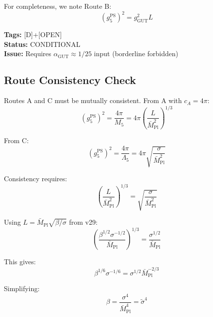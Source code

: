 \documentclass[11pt,a4paper]{article}
\theoremstyle{definition}
\begin{document}
For completeness, we note Route B:
\begin{equation}
\label{eq:route-b-formula}
(g_5^{\text{PS}})^2 = g_{\text{GUT}}^2 L
\end{equation}

\textbf{Tags:} [D]+[OPEN] \\
\textbf{Status:} CONDITIONAL \\
\textbf{Issue:} Requires $\alpha_{\text{GUT}} \approx 1/25$ input (borderline forbidden)

\subsection{Route Consistency Check}
\label{subsec:route-consistency}

Routes A and C must be mutually consistent. From A with $c_A = 4\pi$:
\begin{equation}
\label{eq:consistency-a}
(g_5^{\text{PS}})^2 = \frac{4\pi}{M_5} = 4\pi \left(\frac{L}{\bar{M}_{\text{Pl}}^2}\right)^{1/3}
\end{equation}

From C:
\begin{equation}
\label{eq:consistency-c}
(g_5^{\text{PS}})^2 = \frac{4\pi}{\Lambda_5} = 4\pi \sqrt{\frac{\sigma}{\bar{M}_{\text{Pl}}^2}}
\end{equation}

Consistency requires:
\begin{equation}
\label{eq:consistency-condition}
\left(\frac{L}{\bar{M}_{\text{Pl}}^2}\right)^{1/3} = \sqrt{\frac{\sigma}{\bar{M}_{\text{Pl}}^2}}
\end{equation}

Using $L = \bar{M}_{\text{Pl}}\sqrt{\beta/\sigma}$ from v29:
\begin{equation}
\label{eq:consistency-verify}
\left(\frac{\beta^{1/2}\sigma^{-1/2}}{\bar{M}_{\text{Pl}}}\right)^{1/3} = \frac{\sigma^{1/2}}{\bar{M}_{\text{Pl}}}
\end{equation}

This gives:
\begin{equation}
\label{eq:consistency-beta}
\beta^{1/6} \sigma^{-1/6} = \sigma^{1/2} \bar{M}_{\text{Pl}}^{-2/3}
\end{equation}

Simplifying:
\begin{equation}
\label{eq:consistency-final}
\beta = \frac{\sigma^4}{\bar{M}_{\text{Pl}}^4} = \tilde{\sigma}^4
\end{equation}
\end{document}
